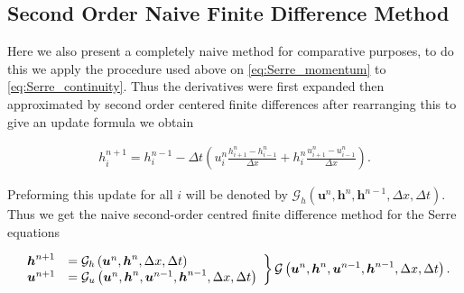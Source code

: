 \documentclass[SingleSpace,12pt,Journal]{Serre_ASCE}
\begin{document}
\subsection{Second Order Naive Finite Difference Method}
Here we also present a completely naive method for comparative purposes, to do this we apply the procedure used above on \eqref{eq:Serre_momentum} to \eqref{eq:Serre_continuity}. Thus the derivatives were first expanded then approximated by second order centered finite differences after rearranging this to give an update formula we obtain
\begin{linenomath*}
\begin{gather}
h^{n+1}_i = h^{n-1}_i - \Delta t \left(u^{n}_{i}\frac{h^{n}_{i+1} - h^{n}_{i-1}}{\Delta x} + h^{n}_{i}\frac{u^{n}_{i+1} - u^{n}_{i-1}}{\Delta x}\right).
\end{gather}
\end{linenomath*}
Preforming this update for all $i$ will be denoted by $\mathcal{G}_h\left(\boldsymbol{u}^n,\boldsymbol{h}^n,\boldsymbol{h}^{n-1} ,\Delta x, \Delta t \right)$.
Thus we get the naive second-order centred finite difference method for the Serre equations
\begin{linenomath*}
\begin{gather}
\left.
\begin{array}{l l}
\boldsymbol{h}^{n+1}&=\mathcal{G}_h\left(\boldsymbol{u}^n,\boldsymbol{h}^n, \Delta x, \Delta t \right) \\
\boldsymbol{u}^{n+1}&=\mathcal{G}_u\left(\boldsymbol{u}^n,\boldsymbol{h}^n, \boldsymbol{u}^{n-1},\boldsymbol{h}^{n-1}, \Delta x, \Delta t \right)
\end{array} \right\rbrace \mathcal{G}\left(\boldsymbol{u}^n,\boldsymbol{h}^n, \boldsymbol{u}^{n-1},\boldsymbol{h}^{n-1}, \Delta x, \Delta t \right).
\end{gather}
\end{linenomath*}
\end{document}
